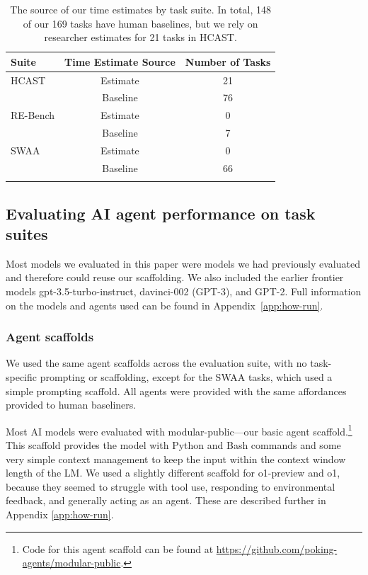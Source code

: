 \documentclass{article}
\newcommand{\gabenchmark}{HCAST}
\begin{document}
\begin{table}[t]
\centering
\begin{tabular}{lcc}
\hline
\textbf{Suite} &\textbf{Time Estimate Source} & \textbf{Number of Tasks} \\
\hline
\gabenchmark{} & Estimate & 21 \\
 & Baseline & 76 \\
\hline
RE-Bench & Estimate & 0 \\
 & Baseline & 7 \\
\hline
SWAA & Estimate & 0 \\
 & Baseline & 66 \\
\hline\\
\end{tabular}
\label{tab:estimate_sources}
\caption{The source of our time estimates by task suite. In total, 148 of our 169 tasks have human baselines, but we rely on researcher estimates for 21 tasks in \gabenchmark{}.}
\end{table}


\subsection{Evaluating AI agent performance on task suites}\label{sec:model-performance}
Most models we evaluated in this paper were models we had previously evaluated and therefore could reuse our scaffolding. We also included the earlier frontier models gpt-3.5-turbo-instruct, davinci-002 (GPT-3), and GPT-2. Full information on the models and agents used can be found in Appendix~\ref{app:how-run}.

\subsubsection{Agent scaffolds}
We used the same agent scaffolds across the evaluation suite, with no task-specific prompting or scaffolding, except for the SWAA tasks, which used a simple prompting scaffold. All agents were provided with the same affordances provided to human baseliners. 

Most AI models were evaluated with {modular-public}---our basic agent scaffold.\footnote{Code for this agent scaffold can be found at \url{https://github.com/poking-agents/modular-public}.} This scaffold provides the model with Python and Bash commands and some very simple context management to keep the input within the context window length of the LM. We used a slightly different scaffold for o1-preview and o1, because they seemed to struggle with tool use, responding to environmental feedback, and generally acting as an agent. These are described further in Appendix \ref{app:how-run}. 
\end{document}
